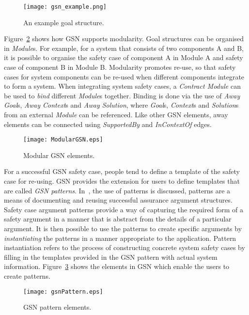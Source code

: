 \begin{figure}
	\centering
	\texttt{[image: gsn\_example.png]}
	\caption{An example goal structure.}
	\label{fig:goalStructure}
\end{figure}
Figure~\ref{fig:modularGSN} shows how GSN supports modularity. 
Goal structures can be organised in \textit{Module}s. 
For example, for a system that consists of two components A and B, it is possible to organise the safety case of component A in Module A and safety case of component B in Module B. 
Modularity promotes re-use, so that safety cases for system components can be re-used when different components integrate to form a system. 
When integrating system safety cases, a \textit{Contract Module} can be used to \textit{bind} different \textit{Module}s together. 
Binding is done via the use of \textit{Away Goal}s, \textit{Away Context}s and \textit{Away Solution}, where \textit{Goal}s, \textit{Context}s and \textit{Solution}s from an external \textit{Module} can be referenced. 
Like other GSN elements, away elements can be connected using \textit{SupportedBy} and \textit{InContextOf} edges.

\begin{figure}
	\centering
	\texttt{[image: ModularGSN.eps]}
	\caption{Modular GSN elements.}
	\label{fig:modularGSN}
\end{figure}
For a successful GSN safety case, people tend to define a template of the safety case for re-using. 
GSN provides the extension for users to define templates that are called \textit{GSN patterns}.
In~\cite{kelly1997safety}, the use of patterns is discussed, patterns are a means of documenting and reusing successful assurance argument structures. 
Safety case argument patterns provide a way of capturing the required form of a safety argument in a manner that is abstract from the details of a particular argument. It is then possible to use the patterns to create specific arguments by \textit{instantiating} the patterns in a manner appropriate to the application. 
Pattern instantiation refers to the process of constructing concrete system safety cases by filling in the templates provided in the GSN pattern with actual system information. Figure~\ref{fig:gsnPatterns} shows the elements in GSN which enable the users to create patterns.

\begin{figure}
	\centering
	\texttt{[image: gsnPattern.eps]}
	\caption{GSN pattern elements.}
	\label{fig:gsnPatterns}
\end{figure}

